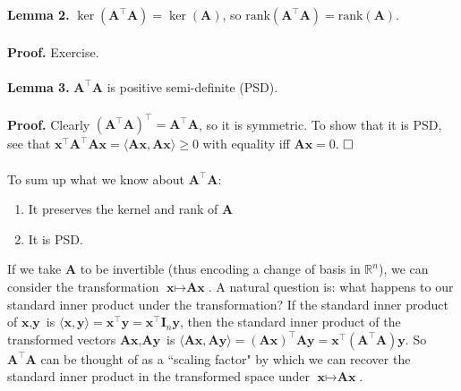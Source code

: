 \documentclass{article}
\begin{document}
\textbf{Lemma 2.}  $\ker(\textbf{A}^\top\textbf{A}) = \ker (\textbf{A})$, so $\text{rank}(\textbf{A}^\top\textbf{A}) = \text{rank}(\textbf{A})$. \\ \\
\textbf{Proof.} Exercise.
\\ \\
\textbf{Lemma 3.} $\textbf{A}^\top\textbf{A}$ is positive semi-definite (PSD). 
\\ \\
\textbf{Proof.} Clearly $(\textbf{A}^\top\textbf{A})^\top = \textbf{A}^\top\textbf{A}$, so it is symmetric. To show that it is PSD, see that $\textbf{x}^\top\textbf{A}^\top\textbf{A}\textbf{x} = \langle \textbf{A}\textbf{x}, \textbf{A}\textbf{x} \rangle \geq 0$ with equality iff $\textbf{A}\textbf{x} = 0$. $\hfill\square$ 
\\ \\
To sum up what we know about $\textbf{A}^\top\textbf{A}$:
\begin{enumerate}[label=(\roman*)]
    \item It preserves the kernel and rank of $\textbf{A}$
    \item It is PSD.
\end{enumerate}
If we take $\textbf{A}$ to be invertible (thus encoding a change of basis in $\mathbb{R}^n$), we can consider the transformation $\textbf{x} \mapsto \textbf{A}\textbf{x}$. A natural question is: what happens to our standard inner product under the transformation? If the standard inner product of $\textbf{x},\textbf{y}$ is $ \langle \textbf{x}, \textbf{y} \rangle = \textbf{x}^\top \textbf{y} = \textbf{x}^\top \textbf{I}_n \textbf{y}$, then the standard inner product of the transformed vectors $\textbf{A}\textbf{x}, \textbf{A}\textbf{y}$ is $\langle \textbf{A}\textbf{x}, \textbf{A}\textbf{y} \rangle = (\textbf{A}\textbf{x})^\top\textbf{A}\textbf{y} = \textbf{x}^\top(\textbf{A}^\top\textbf{A})\textbf{y}$. So $\textbf{A}^\top\textbf{A}$ can be thought of as a ``scaling factor" by which we can recover the standard inner product in the transformed space under $\textbf{x} \mapsto \textbf{A}\textbf{x}$.  
\end{document}
